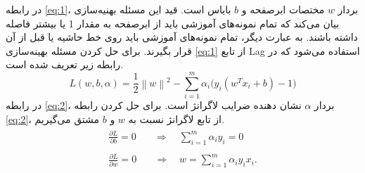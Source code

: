 \noindent در رابطه \ref{eq:1}، بردار $w$ مختصات ابرصفحه و $b$ بایاس است. قید این مسئله بهنیه‌سازی بیان می‌کند که تمام نمونه‌های آموزشی باید از ابرصفحه به مقدار 1 یا بیشتر فاصله داشته باشند. به عبارت دیگر، تمام نمونه‌های آموزشی باید روی خط حاشیه یا قبل از آن قرار بگیرند. برای حل کردن مسئله بهینه‌سازی \ref{eq:1} از تابع \gls{Lag} استفاده می‌شود که در رابطه زیر تعریف شده است. 
\begin{equation}
L(w,b,\alpha )=\frac{1}{2}{{\left\| w \right\|}^{2}}-\sum\limits_{i=1}^{m}{{{\alpha }_{i}}({{y}_{i}}({{w}^{T}}{{x}_{i}}+b)-1})
\label{eq:2}
\end{equation} 
در رابطه \ref{eq:2}، بردار $\alpha$ نشان دهنده ضرایب لاگرانژ است. برای حل کردن رابطه \ref{eq:2}، از تابع لاگرانژ نسبت به $w$ و  $b$ مشتق می‌گیریم.
\begin{align}
\label{eq:3}
\begin{split}
\frac{\partial L}{\partial b}=0&\quad \Rightarrow \quad \sum\limits_{i=1}^{m}{{{\alpha }_{i}}{{y}_{i}}}=0 
\end{split}\\ 
\label{eq:4}
\begin{split}
\frac{\partial L}{\partial w}=0& \quad \Rightarrow \quad w = \sum\limits_{i=1}^{m}{\alpha_{i}y_{i}x_{i}}. 
\end{split} 
\end{align}

